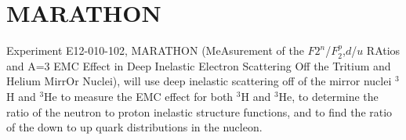 



\section{MARATHON}
Experiment E12-010-102, MARATHON (MeAsurement of the $F2^n$/$F_2^p$,$d$/$u$ RAtios and A=3 EMC Effect in Deep Inelastic Electron Scattering Off the Tritium and Helium MirrOr Nuclei), will use deep inelastic scattering off of the mirror nuclei $^3$H and $^3$He to measure the EMC effect for both $^3$H and $^3$He, to determine the ratio of the neutron to proton inelastic structure functions, and to find the ratio of the down to up quark distributions in the nucleon.

